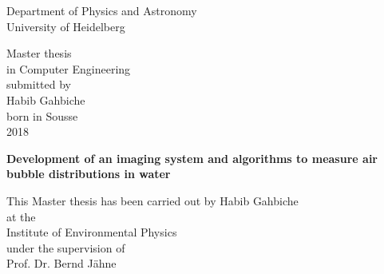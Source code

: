 
\thispagestyle{empty}
\begin{center}
  \renewcommand{\baselinestretch}{2.00}
  \Large\sffamily
  Department of Physics and Astronomy\\
  \large University of Heidelberg
  \par\vfill\normalfont
  Master thesis\\
  in Computer Engineering\\
  submitted by\\
  Habib Gahbiche\\
  born in Sousse\\
  2018
\end{center}
\newpage
\thispagestyle{empty}
\clearpage\mbox{}\clearpage

\thispagestyle{empty}
\begin{center}
  \renewcommand{\baselinestretch}{2.00}
  \Large\bfseries\sffamily
    Development of an imaging system and algorithms to measure air bubble distributions in water\\
  \par
  \vfill
  \large\normalfont
  This Master thesis has been carried out by Habib Gahbiche\\
  at the\\
  Institute of Environmental Physics\\
  under the supervision of\\
  Prof. Dr. Bernd Jähne\\
\end{center}\par
\vspace{5\baselineskip}

\renewcommand{\baselinestretch}{1.00}\normalsize